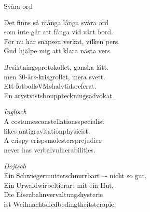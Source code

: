 \begin{song}{Svåra ord}

	
	
	Det finns så många långa svåra ord\\
	som inte går att fånga vid vårt bord.\\
	För nu har snapsen verkat, vilken pers.\\
	Gud hjälpe mig att klara nästa vers.

	Besiktningsprotokollet, ganska lätt.\\
	men 30-års-krisgrollet, mera svett.\\
	Ett fotbollsVMshalvtidsreferat.\\
	En arvstvistsbouppteckningsadvokat.

	\emph{Inglisch}\\
	A costumesconstellationsspecialist\\
	likes antigravitationphysicist.\\
	A crispy crispsmolestersprejudice\\
	never has verbalvulnerabilities.

	\emph{Dojtsch}\\
	Ein Schwiegermutterschnurrbart –- nicht so gut,\\
	Ein Urwaldwirbeltierart mit ein Hut,\\
	Die Eisenbahnvervaltungshysterie\\
	ist Weihnachtsliedbedingtheitsterapie.
	
\end{song}
